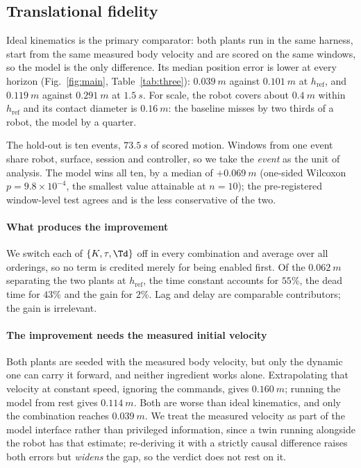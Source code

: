 \subsection{Translational fidelity}
\label{sec:results:rsim}

Ideal kinematics is the primary comparator: both plants run in the same
harness, start from the same measured body velocity and are scored on the same
windows, so the model is the only difference. Its median position error is
lower at every horizon (Fig.~\ref{fig:main}, Table~\ref{tab:three}):
$\SI{0.039}{m}$ against $\SI{0.101}{m}$ at $h_{\mathrm{ref}}$, and
$\SI{0.119}{m}$ against $\SI{0.291}{m}$ at $\SI{1.5}{s}$. For scale, the robot
covers about $\SI{0.4}{m}$ within $h_{\mathrm{ref}}$ and its contact diameter is
$\SI{0.16}{m}$: the baseline misses by two thirds of a robot, the model by a
quarter.

The hold-out is ten events, $\SI{73.5}{s}$ of scored motion. Windows from one
event share robot, surface, session and controller, so we take the \emph{event}
as the unit of analysis. The model wins all ten, by a median of
$+\SI{0.069}{m}$ (one-sided Wilcoxon $p = 9.8\times10^{-4}$, the smallest value
attainable at $n = 10$); the pre-registered window-level test agrees and is the
less conservative of the two.



\paragraph{What produces the improvement}
We switch each of $\{K,\tau,\Td\}$ off in every combination and average over all
orderings, so no term is credited merely for being enabled first. Of the
$\SI{0.062}{m}$ separating the two plants at $h_{\mathrm{ref}}$, the time
constant accounts for $55\%$, the dead time for $43\%$ and the gain for $2\%$.
Lag and delay are comparable contributors; the gain is irrelevant.

\paragraph{The improvement needs the measured initial velocity}
Both plants are seeded with the measured body velocity, but only the dynamic one
can carry it forward, and neither ingredient works alone. Extrapolating that
velocity at constant speed, ignoring the commands, gives $\SI{0.160}{m}$;
running the model from rest gives $\SI{0.114}{m}$. Both are worse than ideal
kinematics, and only the combination reaches $\SI{0.039}{m}$. We treat the
measured velocity as part of the model interface rather than privileged
information, since a twin running alongside the robot has that estimate;
re-deriving it with a strictly causal difference raises both errors but
\emph{widens} the gap, so the verdict does not rest on it.

